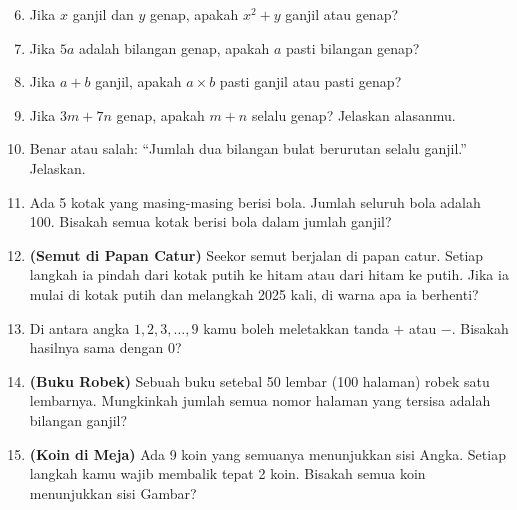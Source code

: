 \documentclass[11pt,a4paper]{article}
\begin{document}
\begin{enumerate}
    \setcounter{enumi}{5}
    \item Jika $x$ ganjil dan $y$ genap, apakah $x^2 + y$ ganjil atau genap?
    \item Jika $5a$ adalah bilangan genap, apakah $a$ pasti bilangan genap?
    \item Jika $a + b$ ganjil, apakah $a \times b$ pasti ganjil atau pasti genap?
    \item Jika $3m + 7n$ genap, apakah $m + n$ selalu genap? Jelaskan alasanmu.
    \item Benar atau salah: ``Jumlah dua bilangan bulat berurutan selalu ganjil.'' Jelaskan.
\end{enumerate}

\begin{enumerate}
    \setcounter{enumi}{10}
    \item Ada 5 kotak yang masing-masing berisi bola. Jumlah seluruh bola adalah 100. Bisakah
          semua kotak berisi bola dalam jumlah ganjil?
    \item \textbf{(Semut di Papan Catur)} Seekor semut berjalan di papan catur. Setiap langkah ia
          pindah dari kotak putih ke hitam atau dari hitam ke putih. Jika ia mulai di kotak putih
          dan melangkah 2025 kali, di warna apa ia berhenti?
    \item Di antara angka $1, 2, 3, \dots, 9$ kamu boleh meletakkan tanda $+$ atau $-$.
          Bisakah hasilnya sama dengan 0?
    \item \textbf{(Buku Robek)} Sebuah buku setebal 50 lembar (100 halaman) robek satu lembarnya.
          Mungkinkah jumlah semua nomor halaman yang tersisa adalah bilangan ganjil?
    \item \textbf{(Koin di Meja)} Ada 9 koin yang semuanya menunjukkan sisi Angka. Setiap langkah
          kamu wajib membalik tepat 2 koin. Bisakah semua koin menunjukkan sisi Gambar?
\end{enumerate}
\end{document}
